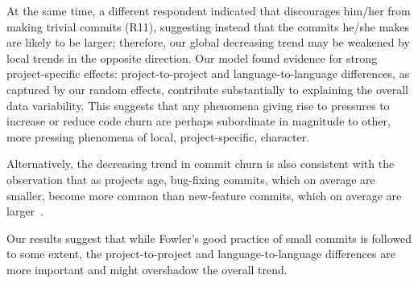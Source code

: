 At the same time, a different respondent indicated that \Tvis discourages 
him/her from making trivial commits (R11), suggesting instead that the 
commits he/she makes are likely to be larger;
therefore, our global decreasing trend may be weakened by local trends
in the opposite direction.
Our model found evidence for strong project-specific effects: 
project-to-project and language-to-language differences, as captured by our 
random effects, contribute substantially to explaining the overall data variability. 
This suggests that any phenomena giving rise to pressures to increase 
or reduce code churn are perhaps subordinate in magnitude to other, 
more pressing phenomena of local, \ie project-specific, character.

Alternatively, the decreasing trend in commit churn is also consistent with 
the observation that as projects age, bug-fixing commits, which on average are smaller, 
become more common than new-feature commits, which on 
average are larger~\cite{brindescu2014centralized}.

Our results suggest that while Fowler's good practice of small commits 
is followed to some extent, the project-to-project and language-to-language 
differences are more important and might overshadow the overall trend.




